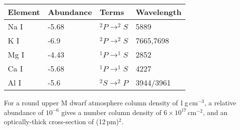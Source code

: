 \documentclass[12pt]{article}
\begin{document}
\begin{tabular}{llll} 
Element & Abundance &Terms & Wavelength \\
 \hline
 Na I & -5.68 &  $^2P \rightarrow ^2S$ & 5889 \\ 
 K I & -6.9 &  $^2P \rightarrow ^2S$ & 7665,7698 \\ 
 Mg I & -4.43 & $^1P \rightarrow ^1S$ & 2852 \\ 
 Ca I & -5.68 &  $^1P \rightarrow ^1S$ & 4227 \\ 
 Al I & -5.6 & $^2S \rightarrow ^2P$ & 3944/3961 \\
 \hline
\end{tabular}

For a round upper M dwarf atmosphere column density of 1\,g\,cm$^{-3}$, a relative abundance of $10^{-6}$ gives a number column density of $6\times10^{17}$\,cm$^{-2}$, and an optically-thick cross-section of (12\,pm)$^2$. 
\end{document}

